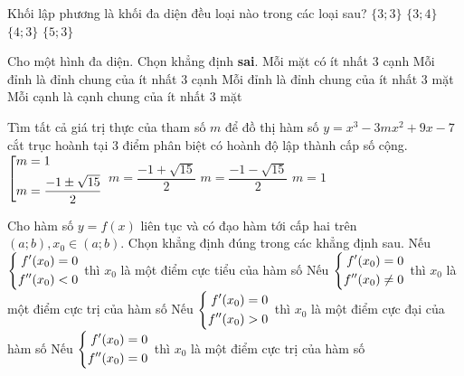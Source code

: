\begin{ex}%
Khối lập phương là khối đa diện đều loại nào trong các loại sau?
\choice
{$\{3;3\}$}
{$\{3;4\}$}
{\True $\{4;3\}$}
{$\{5;3\}$}
\end{ex}

\begin{ex}%
Cho một hình đa diện. Chọn khẳng định \textbf{sai}.
\choice
{Mỗi mặt có ít nhất $3$ cạnh}
{Mỗi đỉnh là đỉnh chung của ít nhất $3$ cạnh}
{Mỗi đỉnh là đỉnh chung của ít nhất $3$ mặt}
{\True Mỗi cạnh là cạnh chung của ít nhất $3$ mặt}
\end{ex}

\begin{ex}%
Tìm tất cả giá trị thực của tham số $m$ để đồ thị hàm số $y = x^3 - 3mx^2 +9x-7$ cắt trục hoành tại $3$ điểm phân biệt có hoành độ lập thành cấp số cộng.
\choice
{\True $\left[\begin{aligned}&m=1\\&m=\dfrac{-1 \pm \sqrt{15}}{2}\end{aligned}\right.$}
{$m=\dfrac{-1+\sqrt{15}}{2}$}
{$m=\dfrac{-1-\sqrt{15}}{2}$}
{$m=1$}
\end{ex}

\begin{ex}%
Cho hàm số $y=f(x)$ liên tục và có đạo hàm tới cấp hai trên $(a;b), x_0 \in (a;b)$. Chọn khẳng định đúng trong các khẳng định sau.
\choice
{Nếu $\left\{\begin{aligned}f'(x_0)=0\\f''(x_0)<0\end{aligned}\right.$ thì $x_0$ là một điểm cực tiểu của hàm số}
{\True Nếu $\left\{\begin{aligned}f'(x_0)=0\\f''(x_0)\neq 0\end{aligned}\right.$ thì $x_0$ là một điểm cực trị của hàm số}
{Nếu $\left\{\begin{aligned}f'(x_0)=0\\f''(x_0)>0\end{aligned}\right.$ thì $x_0$ là một điểm cực đại của hàm số}
{Nếu $\left\{\begin{aligned}f'(x_0)=0\\f''(x_0)=0\end{aligned}\right.$ thì $x_0$ là một điểm cực trị của hàm số}
\end{ex}

